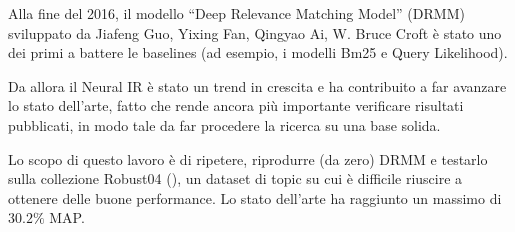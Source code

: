 Alla fine del 2016, il modello ``Deep Relevance Matching Model'' (DRMM) sviluppato da  Jiafeng Guo, Yixing Fan, Qingyao Ai, W. Bruce Croft è stato uno dei primi a battere le baselines (ad esempio, i modelli Bm25 e Query Likelihood).

Da allora il Neural IR è stato un trend in crescita e ha contribuito a far avanzare lo stato dell'arte, fatto che rende ancora più importante verificare risultati pubblicati, in modo tale da far procedere la ricerca su una base solida.

Lo scopo di questo lavoro è di ripetere, riprodurre (da zero) DRMM e testarlo sulla collezione Robust04 (\cite{rob04}), un dataset di topic su cui è difficile riuscire a ottenere delle buone performance. Lo stato dell'arte ha raggiunto un massimo di $30.2 \%$ MAP.